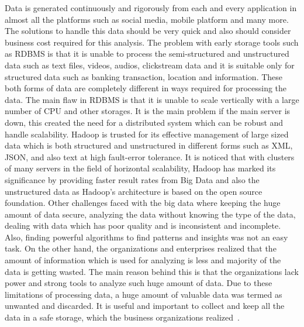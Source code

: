 Data is generated continuously and rigorously from each and every application in
almost all the platforms such as social media, mobile platform and many more. 
The solutions to handle this data should be very quick and also should consider
business cost required for this analysis. The problem with early storage tools 
such as RDBMS is that it is unable to process the semi-structured and 
unstructured data such as text files, videos, audios, clickstream data and
it is suitable only for structured data such as banking transaction, location 
and information. These both forms of data are completely different in ways 
required for processing the data. The main flaw in RDBMS is that it is unable to
scale vertically with a large number of CPU and other storages. It is the main 
problem if the main server is down, this created the need for a distributed 
system which can be robust and handle scalability. Hadoop is trusted for its 
effective management of large sized data which is both structured and 
unstructured in different forms such as XML, JSON, and also text at high 
fault-error tolerance. It is noticed that with clusters of many servers in the 
field of horizontal scalability, Hadoop has marked its significance by providing
faster result rates from Big Data and also the unstructured data as Hadoop's 
architecture is based on the open source foundation. Other challenges faced with
the big data where keeping the huge amount of data secure, analyzing the data 
without knowing the type of the data, dealing with data which has poor quality 
and is inconsistent and incomplete. Also, finding powerful algorithms to find 
patterns and insights was not an easy task. On the other hand, the organizations
and enterprises realized that the amount of information which is used for 
analyzing is less and majority of the data is getting wasted. The main reason 
behind this is that the organizations lack power and strong tools to analyze 
such huge amount of data. Due to these limitations of processing data, a huge 
amount of valuable data was termed as unwanted and discarded. It is useful and 
important to collect and keep all the data in a safe storage, which the business
organizations realized~\cite{hid-sp18-406-hadoop-intro1}.

